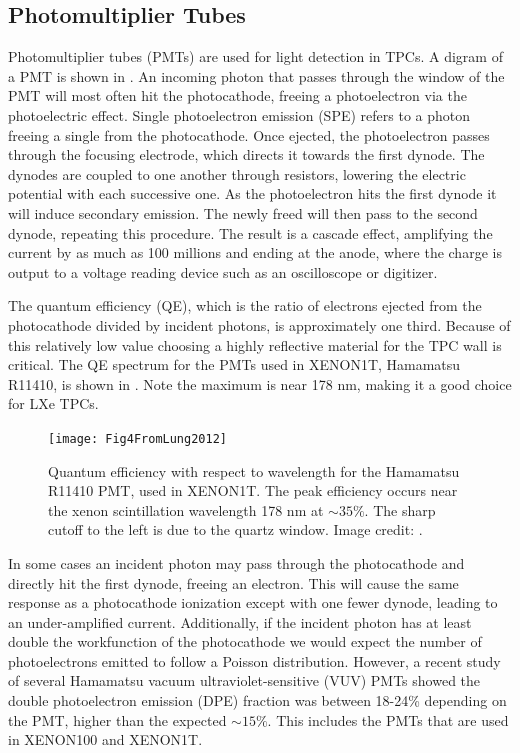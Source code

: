 \subsection{Photomultiplier Tubes}
\label{subsec:tpcs_pmts}
Photomultiplier tubes (PMTs) are used for light detection in TPCs.  A digram of a PMT is shown in .  An
incoming photon that
passes through the window of the PMT will most often hit the photocathode, freeing a photoelectron via the photoelectric effect.  Single
photoelectron emission (SPE) refers to a photon freeing a single \electron from the photocathode.  Once ejected, the photoelectron passes
through the focusing
electrode, which directs it towards the first dynode.  The dynodes are coupled to one another through resistors, lowering the electric
potential with each successive one.  As the photoelectron hits the first dynode it will induce secondary emission.  The newly freed
\electron will then pass to the
second dynode, repeating this procedure.  The result is a cascade effect, amplifying the current by as much as 100 millions and ending
at the anode, where the charge is output to a voltage reading device such as an oscilloscope or digitizer.

The
quantum efficiency (QE), which is the ratio of electrons ejected from the photocathode divided by incident photons, is approximately
one third.  Because of this relatively low value choosing a highly reflective material for the TPC wall is critical.  The QE spectrum for
the PMTs used in XENON1T, Hamamatsu R11410, is shown in .  Note the maximum is near 178 nm, making it a good
choice for LXe TPCs.  

\begin{figure}
\centering
\texttt{[image: Fig4FromLung2012]}
\caption{Quantum efficiency with respect to wavelength for the Hamamatsu R11410 PMT, used in XENON1T.  The peak efficiency occurs near
the xenon scintillation wavelength 178 nm at $\sim 35 \%$.  The sharp cutoff to the left is due to the quartz window.  Image credit:
.}
\label{fig:tpcs_pmts_qe}
\end{figure}

In some cases an incident photon may pass through the photocathode and directly hit the first dynode, freeing an electron.  This will
cause the same response as a photocathode ionization except with one fewer dynode, leading to an under-amplified current.  Additionally,
if the incident photon has at least double the workfunction of the photocathode we would expect the number of photoelectrons emitted to
follow a Poisson distribution.  However, a recent study of several Hamamatsu vacuum ultraviolet-sensitive (VUV) PMTs showed the double
photoelectron emission
(DPE) fraction was between 18-24\% depending on the PMT, higher than the expected $\sim 15\%$.  This includes the PMTs that are used in
XENON100 and XENON1T.

